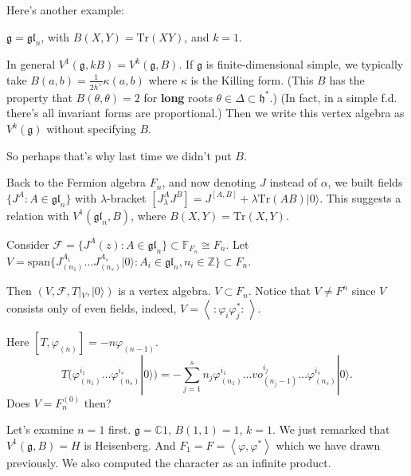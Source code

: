 \medskip{}

Here's another example:

\begin{example}
\label{example-fermi-unive-verte-algeb}
$\mathfrak{g}=\mathfrak{gl}_n$, with
$B(X,Y)=\text{Tr}(XY)$,
and $k=1$.
\end{example}

\begin{remark}
\label{remark-resca-killi-form-coxet-numbe}
In general
$V^1(\mathfrak{g},kB)=V^k(\mathfrak{g},B)$.
If $\mathfrak{g}$ is finite-dimensional
simple, we
typically take $B(a,b)=\frac{1}{2
h^\vee}\kappa(a,b)$
where $\kappa$ is the Killing form. (This $B$
has the property that $B(\theta,\theta)=2$
for {\bf long} roots $\theta \in \Delta
\subset \mathfrak{h}^*$.)
(In fact, in a simple f.d. there's
all invariant forms are proportional.)
Then we write this vertex algebra
as $V^k(\mathfrak{g})$ without specifying
$B$.
\end{remark}

So perhaps that's why last time we didn't put
$B$.

\medskip\noindent
Back to the Fermion algebra $F_n$, and now
denoting $J$ instead of $\alpha$,
we built fields
$\{J^A:A \in \mathfrak{gl}_n\}$ with
$\lambda$-bracket
$[J^A_\lambda
J^B]=J^{[A,B]}+\lambda\text{Tr}(AB)
|0\rangle$.
This suggests a relation with
$V^1(\mathfrak{gl}_n,B)$,
where $B(X,Y)=\text{Tr}(X,Y)$.

Consider $\mathcal{F}=\{J^A(z):A \in
\mathfrak{gl}_n\}\subset \mathbb{F}_{F_n}
\cong F_n$.
Let $V=\text{span}\{J^{A_1}_{(n_1)}\ldots
J^{A_s}_{(n_s)}|0\rangle:
A_i \in \mathfrak{gl}_n,n_i \in
\mathbb{Z}\}\subset F_n$.

Then $(V,\mathcal{F},T|_{V},|0\rangle)$ is a
vertex algebra.
$V \subset F_n$. Notice that $V \neq F^n$
since $V$ consists only of even fields,
indeed, $V=\left\langle{}\,:\!\varphi_i
\varphi_j^*\!:\,\right\rangle{}$.

Here $[T,\varphi_{(n)}]=-n\varphi_{(n-1)}$.
$$
T(\varphi^{i_1}_{(n_1)}\ldots\varphi^{i_s}
_{(n_s)}|0\rangle)
=-\sum_{j=1}^s n_j\varphi_{(n_1)}^{i_1}
\ldots vo_{(n_j-1)}^{i_j}\ldots
\varphi_{(n_s)}^{i_s}|0\rangle.
$$
Does $V=F^{(0)}_n$ then?

Let's examine $n=1$ first.
$\mathfrak{g}=\mathbb{C}1$,
$B(1,1)=1$, $k=1$. We just remarked
that $V^1(\mathfrak{g},B)=H$ is
Heisenberg. And
$F_1=F=\left\langle{}\varphi,\varphi^*\right\rangle{}$
which we have drawn previously.
We also computed
the character as an infinite product.

